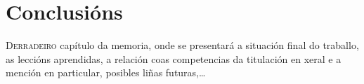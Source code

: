 \chapter{Conclusións}
\label{chap:conclusions}

\lettrine{D}{erradeiro} capítulo da memoria, onde se presentará a
situación final do traballo, as leccións aprendidas, a relación coas
competencias da titulación en xeral e a mención en particular,
posibles liñas futuras,\dots